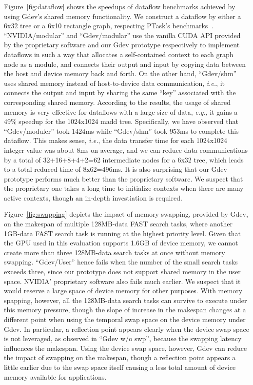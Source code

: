 Figure~\ref{fig:dataflow} shows the speedups of dataflow benchmarks
achieved by using Gdev's shared memory functionality.
We construct a dataflow by either a 6x32 tree or a 6x10 rectangle
graph, respecting PTask's benchmarks~\cite{Rossbach_SOSP11}.
``NVIDIA/modular'' and ``Gdev/modular'' use the vanilla CUDA API
provided by the proprietary software and our Gdev prototype
respectively to implement dataflows in such a way that allocates a
self-contained context to each graph node as a module, and connects
their output and input by copying data between the host and device
memory back and forth.
On the other hand, ``Gdev/shm'' uses shared memory instead of
host-to-device data communication, \textit{i.e.}, it connects the output
and input by sharing the same ``key'' associated with the corresponding
shared memory.
According to the results, the usage of shared memory is very effective
for dataflows with a large size of data, \textit{e.g.}, it gains a 49\%
speedup for the 1024x1024 madd tree.
Specifically, we have observed that ``Gdev/moduler'' took 1424ms while
``Gdev/shm'' took 953ms to complete this dataflow.
This makes sense, \textit{i.e.}, the data transfer time for each
1024x1024 integer value was about 8ms on average, and we can reduce data
communications by a total of 32+16+8+4+2=62 intermediate nodes for a
6x32 tree, which leads to a total reduced time of 8x62=496ms.
It is also surprising that our Gdev prototype performs much better than
the proprietary software.
We suspect that the proprietary one takes a long time to initialize
contexts when there are many active contexts, though an in-depth
investiation is required.

Figure~\ref{fig:swapping} depicts the impact of memory swapping,
provided by Gdev, on the makespan of multiple 128MB-data FAST search
tasks, where another 1GB-data FAST search task is running at the highest
priority level.
Given that the GPU used in this evaluation supports
1.6GB of device memory, we cannot create more than three 128MB-data
search tasks at once without memory swapping.
``Gdev/User'' hence fails when the number of the small search tasks
exceeds three, since our prototype does not support shared memory in the
user space.
NVIDIA' proprietary software also fails much earlier.
We suspect that it would reserve a large space of device memory for
other purposes.
With memory spapping, however, all the 128MB-data search tasks can
survive to execute under this memory pressure, though the slope of
increase in the makespan changes at a different point when using the
temporal swap space on the device memory under Gdev.
In particular, a reflection point appears clearly when the device swap
space is not leveraged, as observed in ``Gdev w/o swp'', because the
swapping latency influences the makespan.
Using the device swap space, however, Gdev can reduce the impact of
swapping on the makespan, though a reflection point appears a little
earlier due to the swap space itself causing a less total amount of
device memory available for applications.


